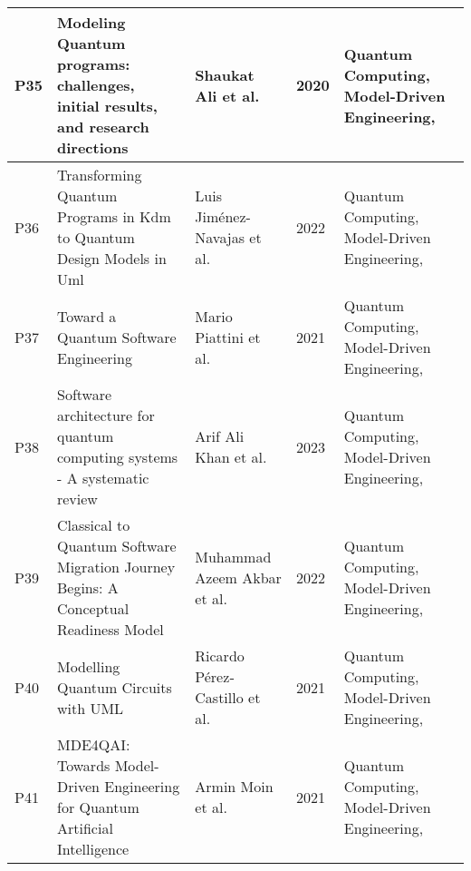 \begin{longtable}{|m{0.8cm}|m{4.4cm}|m{3cm}|m{0.8cm}|m{4cm}|}
    P35 & Modeling Quantum programs: challenges, initial results, and research directions & Shaukat Ali et al.~\cite{Ali_2020} & 2020 & Quantum Computing, Model-Driven Engineering,  \\ \hline
    P36 & Transforming Quantum Programs in Kdm to Quantum Design Models in Uml & Luis Jiménez-Navajas et al.~\cite{Jimenez-Navajas_2022} & 2022 & Quantum Computing, Model-Driven Engineering,  \\ \hline
    P37 & Toward a Quantum Software Engineering & Mario Piattini et al.~\cite{Piattini_2021} & 2021 & Quantum Computing, Model-Driven Engineering,  \\ \hline
    P38 & Software architecture for quantum computing systems - A systematic review & Arif Ali Khan et al.~\cite{khan2023software} & 2023 & Quantum Computing, Model-Driven Engineering,  \\ \hline
    P39 & Classical to Quantum Software Migration Journey Begins: A Conceptual Readiness Model & Muhammad Azeem Akbar et al.~\cite{Akbar_2022} & 2022 & Quantum Computing, Model-Driven Engineering,  \\ \hline
    P40 & Modelling Quantum Circuits with UML & Ricardo Pérez‐Castillo et al.~\cite{Perez-Castillo_2021} & 2021 & Quantum Computing, Model-Driven Engineering,  \\ \hline
    P41 & MDE4QAI: Towards Model-Driven Engineering for Quantum Artificial Intelligence & Armin Moin et al.~\cite{Moin_2021} & 2021 & Quantum Computing, Model-Driven Engineering,  \\ \hline
\end{longtable}

